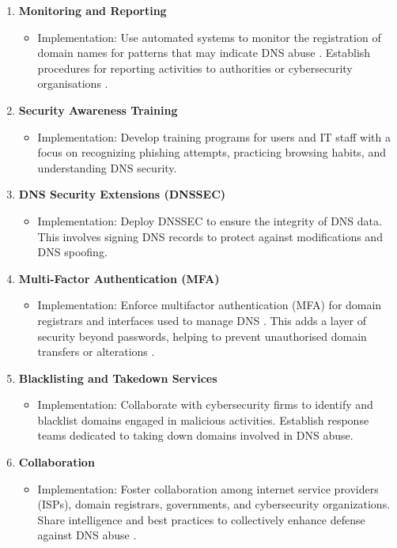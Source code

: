 \begin{enumerate}
    \item \textbf{Monitoring and Reporting}
    \begin{itemize}
        \item Implementation: Use automated systems to monitor the registration of domain names for patterns that may indicate DNS abuse \cite{icannndnssec}. Establish procedures for reporting activities to authorities or cybersecurity organisations \cite{lucas2021tls}.
    \end{itemize}
    \item \textbf{Security Awareness Training}
    \begin{itemize}
        \item Implementation: Develop training programs for users and IT staff with a focus on recognizing phishing attempts, practicing browsing habits, and understanding DNS security.
    \end{itemize}
    \item \textbf{DNS Security Extensions (DNSSEC)}
    \begin{itemize}
        \item Implementation: Deploy DNSSEC to ensure the integrity of DNS data. This involves signing DNS records to protect against modifications and DNS spoofing.
    \end{itemize}
    \item \textbf{Multi-Factor Authentication (MFA)}
    \begin{itemize}
        \item Implementation: Enforce multifactor authentication (MFA) for domain registrars and interfaces used to manage DNS \cite{icannndnssec}. This adds a layer of security beyond passwords, helping to prevent unauthorised domain transfers or alterations \cite{moghaddam2014ecco}.
    \end{itemize}
    \item \textbf{Blacklisting and Takedown Services}
    \begin{itemize}
        \item Implementation: Collaborate with cybersecurity firms to identify and blacklist domains engaged in malicious activities. Establish response teams dedicated to taking down domains involved in DNS abuse.
    \end{itemize}
    \item \textbf{Collaboration}
    \begin{itemize}
        \item Implementation: Foster collaboration among internet service providers (ISPs), domain registrars, governments, and cybersecurity organizations. Share intelligence and best practices to collectively enhance defense against DNS abuse \cite{skopik2017collaborative}.

\end{itemize}
\end{enumerate}
